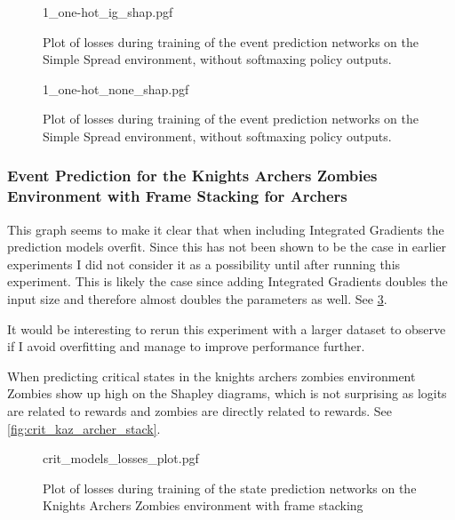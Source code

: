 \documentclass[UKenglish]{uiomasterthesis}
\begin{document}
\begin{figure}[hbtp]
    \centering
    {1_one-hot_ig_shap.pgf}
    \caption{Plot of losses during training of the event prediction networks on the Simple Spread environment, without softmaxing policy outputs.}
    \label{fig:state_kaz_archer_stack_ig}
\end{figure}

\begin{figure}[hbtp]
    \centering
    {1_one-hot_none_shap.pgf}
    \caption{Plot of losses during training of the event prediction networks on the Simple Spread environment, without softmaxing policy outputs.}
    \label{fig:state_kaz_archer_stack}
\end{figure}


\subsubsection{Event Prediction for the Knights Archers Zombies Environment with Frame Stacking for Archers}

This graph seems to make it clear that when including Integrated Gradients the prediction models overfit. Since this has not been shown to be the case in earlier experiments I did not consider it as a possibility until after running this experiment. This is likely the case since adding Integrated Gradients doubles the input size and therefore almost doubles the parameters as well. See \cref{fig:crit_losses_kaz_archer_stack}.

It would be interesting to rerun this experiment with a larger dataset to observe if I avoid overfitting and manage to improve performance further.

When predicting critical states in the knights archers zombies environment Zombies show up high on the Shapley diagrams, which is not surprising as logits are related to rewards and zombies are directly related to rewards. See \cref{fig:crit_kaz_archer_stack}.

\begin{figure}[hbtp]
    \centering
    {crit_models_losses_plot.pgf}
    \caption{Plot of losses during training of the state prediction networks on the Knights Archers Zombies environment with frame stacking}
	\label{fig:crit_losses_kaz_archer_stack}
\end{figure}
\end{document}
